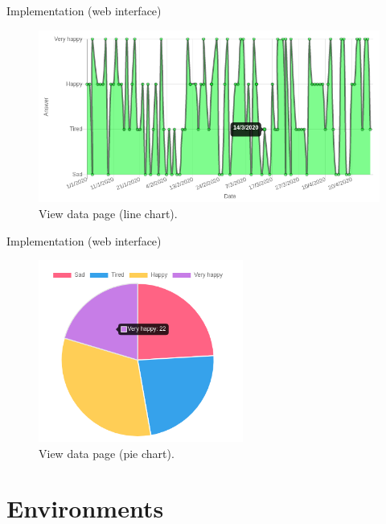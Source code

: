 \documentclass{beamer}
\begin{document}
\begin{frame}[fragile]{Implementation (web interface)}
  \begin{figure}[H]
    \centering
      \includegraphics[width=\textwidth]{view_data_1.png}
    \caption{View data page (line chart).}
  \end{figure}
\end{frame}

\begin{frame}[fragile]{Implementation (web interface)}
  \begin{figure}[H]
    \centering
      \includegraphics[width=0.6\textwidth]{view_data_2.png}
    \caption{View data page (pie chart).}
  \end{figure}
\end{frame}

\section{Environments}
\end{document}
